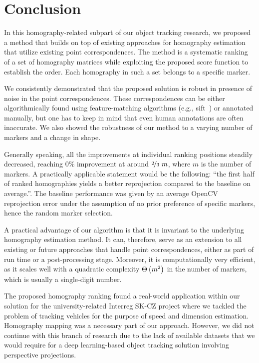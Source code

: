 \section{Conclusion}

In this homography-related subpart of our object tracking research, we proposed a method that builds on top of existing approaches for homography estimation that utilize existing point correspondences. The method is a systematic ranking of a set of homography matrices while exploiting the proposed score function to establish the order. Each homography in such a set belongs to a specific marker.

We consistently demonstrated that the proposed solution is robust in presence of noise in the point correspondences. These correspondences can be either algorithmically found using feature-matching algorithms (e.g., \gls{sift}~\cite{lowel1999objrecognition}) or annotated manually, but one has to keep in mind that even human annotations are often inaccurate. We also showed the robustness of our method to a varying number of markers and a change in shape.

Generally speaking, all the improvements at individual ranking positions steadily decreased, reaching $0$\% improvement at around $\nicefrac{2}{3}~m$, where $m$ is the number of markers. A practically applicable statement would be the following: ``the first half of ranked homographies yields a better reprojection compared to the baseline on average.''. The baseline performance was given by an average OpenCV~\cite{bradski2008learning} reprojection error under the assumption of no prior preference of specific markers, hence the random marker selection.

A practical advantage of our algorithm is that it is invariant to the underlying homography estimation method. It can, therefore, serve as an extension to all existing or future approaches that handle point correspondences, either as part of run time or a post-processing stage. Moreover, it is computationally very efficient, as it scales well with a quadratic complexity ${\Theta} \left( m^2 \right)$ in the number of markers, which is usually a single-digit number.

The proposed homography ranking found a real-world application within our solution for the university-related Interreg SK-CZ project where we tackled the problem of tracking vehicles for the purpose of speed and dimension estimation. Homography mapping was a necessary part of our approach. However, we did not continue with this branch of research due to the lack of available datasets that we would require for a deep learning-based object tracking solution involving perspective projections.

